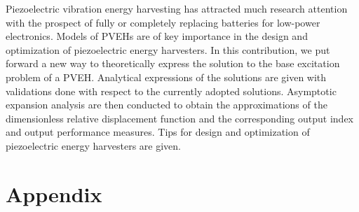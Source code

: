 \documentclass{svjour3}                     %
\begin{document}
Piezoelectric vibration energy harvesting has attracted much research attention with the prospect of fully or completely replacing batteries for low-power electronics. Models of PVEHs are of key importance in the design and optimization of piezoelectric energy harvesters. In this contribution, we put forward a new way to theoretically express the solution to the base excitation problem of a PVEH. Analytical expressions of the solutions are given with validations done with respect to the currently adopted solutions. Asymptotic expansion analysis are then conducted to obtain the approximations of the dimensionless relative displacement function and the corresponding output index and output performance measures. Tips for design and optimization of piezoelectric energy harvesters are given. 

\section*{Appendix}
\label{sec:sec_appendix}
\end{document}
